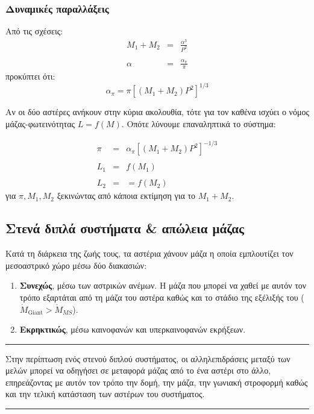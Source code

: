 \subsubsection{Δυναμικές παραλλάξεις}
 Από τις σχέσεις:
 \begin{eqnarray*}
    M_1 + M_2 &=& \frac{\alpha^3}{P^2} \\\\
    \alpha &=& \frac{\alpha_{\pi}}{\pi} 
 \end{eqnarray*}
 προκύπτει ότι:
 \begin{equation}
     \alpha_{\pi} = \pi \left[ (M_1 + M_2)P^2 \right]^{1/3}
 \end{equation}
 
 Αν οι δύο αστέρες ανήκουν στην κύρια ακολουθία, τότε για τον καθένα ισχύει ο νόμος μάζας-φωτεινότητας $L = f(M)$. Οπότε λύνουμε επαναληπτικά το σύστημα:
 
 \begin{eqnarray*}
    \pi &=& \alpha_{\pi} \left[ (M_1 + M_2)P^2 \right]^{-1/3} \\\\
    L_1 &=& f(M_1) \\\\
    L_2 &=& = f(M_2)
 \end{eqnarray*}
 για $\pi, M_1, M_2$ ξεκινώντας από κάποια εκτίμηση για το $M_1 + M_2$.  




\subsection{Στενά διπλά συστήματα \& απώλεια μάζας}
Κατά τη διάρκεια της ζωής τους, τα αστέρια χάνουν μάζα η οποία εμπλουτίζει τον μεσοαστρικό χώρο μέσω δύο διακασιών:
\begin{enumerate}[label=(\alph*)]
    \item \textbf{Συνεχώς}, μέσω των αστρικών ανέμων. Η μάζα που μπορεί να χαθεί με αυτόν τον τρόπο εξαρτάται από τη μάζα του αστέρα καθώς και το στάδιο της εξέλιξής του ($\dot{M}_{\text{Giant}} > \dot{M}_{MS}$).
    \item \textbf{Εκρηκτικώς}, μέσω καινοφανών και υπερκαινοφανών εκρήξεων.
\end{enumerate}

{\color{red} \hrule}
Στην περίπτωση ενός στενού διπλού συστήματος, οι αλληλεπιδράσεις μεταξύ των μελών μπορεί να οδηγήσει σε μεταφορά μάζας από το ένα αστέρι στο άλλο, επηρεάζοντας με αυτόν τον τρόπο την δομή, την μάζα, την γωνιακή στροφορμή καθώς και την τελική κατάσταση των αστέρων του συστήματος.
{\color{red} \hrule}

